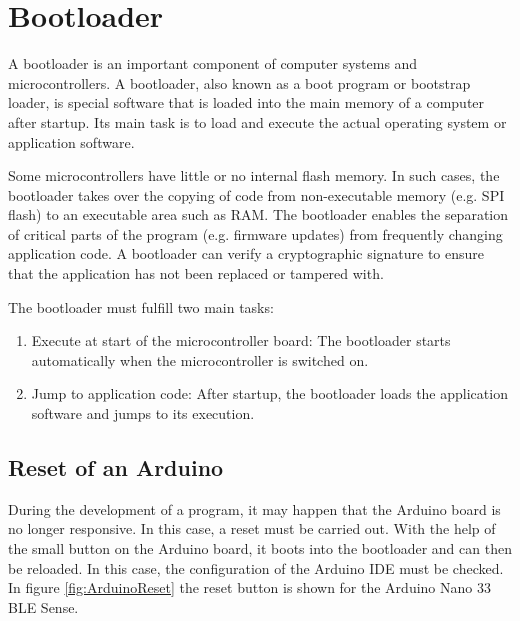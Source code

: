 %
%
%




\chapter{Bootloader}

A bootloader is an important component of computer systems and microcontrollers. A bootloader, also known as a boot program or bootstrap loader, is special software that is loaded into the main memory of a computer after startup.
Its main task is to load and execute the actual operating system or application software.

Some microcontrollers have little or no internal flash memory. In such cases, the bootloader takes over the copying of code from non-executable memory (e.g. SPI flash) to an executable area such as RAM. The bootloader enables the separation of critical parts of the program (e.g. firmware updates) from frequently changing application code.
A bootloader can verify a cryptographic signature to ensure that the application has not been replaced or tampered with.

\bigskip

The bootloader must fulfill two main tasks:

\begin{enumerate}
  \item Execute at start of the microcontroller board: The bootloader starts automatically when the microcontroller is switched on.
  \item Jump to application code: After startup, the bootloader loads the application software and jumps to its execution.
\end{enumerate}

\bigskip

\section{Reset of an Arduino}

During the development of a program, it may happen that the Arduino board is no longer responsive. In this case, a reset must be carried out. With the help of the small button on the Arduino board, it boots into the bootloader and can then be reloaded. In this case, the configuration of the Arduino IDE must be checked. In figure \ref{fig:ArduinoReset} the reset button is shown for the Arduino Nano 33 BLE Sense. 

